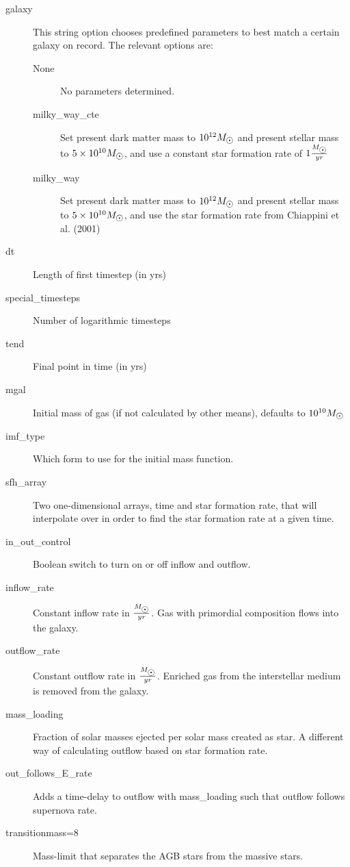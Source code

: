 \begin{description}
\item[galaxy]
  This string option chooses predefined parameters to best match a certain galaxy on record.
  The relevant options are:
  \begin{description}
  \item[None] No parameters determined.
  \item[milky\_way\_cte] Set present dark matter mass to $10^{12} \msol$ and present stellar mass to $5\times10^{10} \msol$, and use a constant star formation rate of $1 \frac{\msol}{yr}$
  \item[milky\_way] Set present dark matter mass to $10^{12} \msol$ and present stellar mass to $5\times10^{10} \msol$, and use the star formation rate from Chiappini et al. (2001) 
  \end{description}
\item[dt] Length of first timestep (in yrs)
\item[special\_timesteps] Number of logarithmic timesteps
\item[tend] Final point in time (in yrs)
\item[mgal] Initial mass of gas (if not calculated by other means), defaults to $10^{10} \msol$
\item[imf\_type] Which form to use for the initial mass function. 
\item[sfh\_array] Two one-dimensional arrays, time and star formation rate, that \omegamodel will interpolate over in order to find the star formation rate at a given time.
\item[in\_out\_control] Boolean switch to turn on or off inflow and outflow.
\item[inflow\_rate] Constant inflow rate in $\frac{\msol}{yr}$. Gas with primordial composition  flows into the galaxy.
\item[outflow\_rate]  Constant outflow rate in $\frac{\msol}{yr}$. Enriched gas from the interstellar medium is removed from the galaxy.
\item[mass\_loading] Fraction of solar masses ejected per solar mass created as star. A different way of calculating outflow based on star formation rate.
\item[out\_follows\_E\_rate] Adds a time-delay to outflow with mass\_loading such that outflow follows supernova rate.
\item[transitionmass=8]
  Mass-limit that separates the AGB stars from the massive stars.

\end{description}
